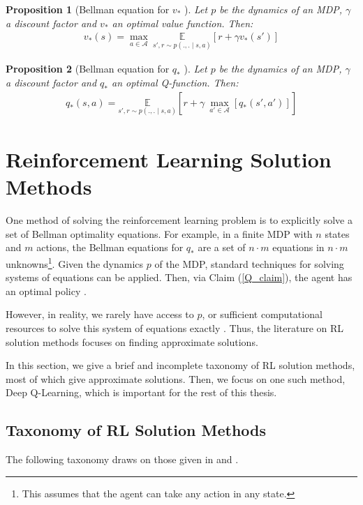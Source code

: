 \documentclass[11pt, a4paper, bibliography=totoc]{report}
\newtheorem{proposition}{Proposition}
\begin{document}
\begin{proposition}[Bellman equation for $ v_* $ {\cite[p.~63]{Sutton2018}}]
	Let $ p $ be the dynamics of an MDP, $ \gamma $ a discount factor and $ v_* $ an optimal value function. Then:
	\begin{align}
	v_*(s) = \max_{a \in \mathcal{A}} ~ \underset{s', r \sim p(., . \mid s, a)}{\mathbb{E}} \left[ r + \gamma v_*(s') \right]
	\end{align}
\end{proposition}

\begin{proposition}[Bellman equation for $ q_* $ {\cite[p.~63]{Sutton2018}}]
	Let $ p $ be the dynamics of an MDP, $ \gamma $ a discount factor and $ q_* $ an optimal Q-function. Then:
	\begin{align}
	q_*(s, a) = \underset{s', r \sim p(., . \mid s, a)}{\mathbb{E}} \left[ r + \gamma ~ \underset{a' \in \mathcal{A}}{\max}\left[q_*(s', a')\right] \right]
	\end{align}
\end{proposition}

\section{Reinforcement Learning Solution Methods} \label{RL_solution_methods}
One method of solving the reinforcement learning problem is to explicitly solve a set of Bellman optimality equations. For example, in a finite MDP with $ n $ states and $ m $ actions, the Bellman equations for $ q_* $ are a set of $ n\cdot m $ equations in $ n\cdot m $ unknowns\footnote{This assumes that the agent can take any action in any state.}. Given the dynamics $ p $ of the MDP, standard techniques for solving systems of equations can be applied. Then, via Claim (\ref{Q_claim}), the agent has an optimal policy \cite[p.~64]{Sutton2018}.

However, in reality, we rarely have access to $ p $, or sufficient computational resources to solve this system of equations exactly \cite[p.~66]{Sutton2018}. Thus, the literature on RL solution methods focuses on finding approximate solutions.

In this section, we give a brief and incomplete taxonomy of RL solution methods, most of which give approximate solutions. Then, we focus on one such method, Deep Q-Learning, which is important for the rest of this thesis.

\subsection{Taxonomy of RL Solution Methods}
The following taxonomy draws on those given in \cite{Sutton2018} and \cite{Achiam2019}.
\end{document}
